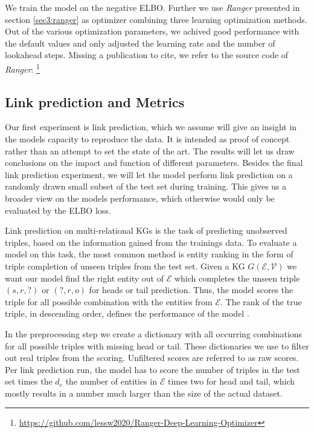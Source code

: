 We train the model on the negative ELBO. Further we use \textit{Ranger} presented in section \ref{sec3:ranger} as optimizer combining three learning optimization methods. Out of the various optimization parameters, we achived good performance with the default values and  only adjusted the learning rate and the number of lookahead steps. Missing a publication to cite, we refer to the source code of \textit{Ranger}: \footnote{\url{https://github.com/lessw2020/Ranger-Deep-Learning-Optimizer}}



\subsection{Link prediction and Metrics}
\label{ssec4:lpmetrics}
Our first experiment is link prediction, which we assume will give an insight in the models capacity to reproduce the data. It is intended as proof of concept rather than an attempt to set the state of the art. The results will let us draw conclusions on the impact and function of different parameters.
Besides the final link prediction experiment, we will let the model perform link prediction on a randomly drawn small subset of the test set during training. This gives us a broader view on the models performance, which otherwise would only be evaluated by the ELBO loss.  

Link prediction on multi-relational KGs is the task of predicting unobserved triples, based on the information gained from the trainings data. To evaluate a model on this task, the most common method is entity ranking in the form of triple completion of unseen triples from the test set. Given a KG $G(\mathcal{E},\mathcal{V})$ we want our model find the right entity out of $\mathcal{E}$ which completes the unseen triple $(s,r,?)$ or $(?,r,o)$ for heads or tail prediction. Thus, the model scores the triple for all possible combination with the entities from $\mathcal{E}$. The rank of the true triple, in descending order, defines the performance of the model \cite{ruffinelli_you_2019}.

In the preprocessing step we create a dictionary with all occurring combinations for all possible triples with missing head or tail. These dictionaries we use to filter out real triples from the scoring. Unfiltered scores are referred to as raw scores. Per link prediction run, the model has to score the number of triples in the test set times the $d_e$ the number of entities in $\mathcal{E}$ times two for head and tail, which mostly results in a number much larger than the size of the actual dataset.

